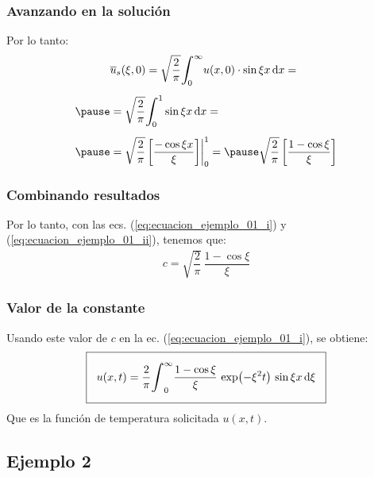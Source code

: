 \documentclass[12pt]{beamer}
\begin{document}
\begin{frame}
\frametitle{Avanzando en la solución}
Por lo tanto:
\pause
\begin{eqnarray}
\begin{aligned}[b]
&{} \overline{u}_{s} (\xi, 0) = \sqrt{\dfrac{2}{\pi}} \scaleint{6ex}_{\bs 0}^{\infty} u(x, 0) \cdot \sin \xi x \dd{x} = \\[0.5em] \pause
&= \sqrt{\dfrac{2}{\pi}} \scaleint{6ex}_{\bs 0}^{1} \sin \xi x \dd{x} = \\[0.5em] \pause
&= \sqrt{\dfrac{2}{\pi}} \, \bigg[ \dfrac{- \cos \xi x}{\xi} \bigg] \bigg|_{0}^{1} = \pause \sqrt{\dfrac{2}{\pi}} \, \bigg[ \dfrac{1 - \cos \xi}{\xi} \bigg]
\end{aligned}
\label{eq:ecuacion_ejemplo_01_ii}
\end{eqnarray}
\end{frame}
\begin{frame}
\frametitle{Combinando resultados}
Por lo tanto, con las ecs. (\ref{eq:ecuacion_ejemplo_01_i}) y (\ref{eq:ecuacion_ejemplo_01_ii}), tenemos que:
\pause
\begin{align*}
c = \sqrt{\dfrac{2}{\pi}} \, \dfrac{1 - \cos \xi}{\xi}
\end{align*}
\end{frame}
\begin{frame}
\frametitle{Valor de la constante}
Usando este valor de $c$ en la ec. (\ref{eq:ecuacion_ejemplo_01_i}), se obtiene:
\pause
\begin{align*}
\setlength{\fboxsep}{3\fboxsep}\boxed{
u(x, t) = \dfrac{2}{\pi} \scaleint{6ex}_{0}^{\infty} \dfrac{1 - \cos \xi}{\xi} \, \exp(- \xi^{2} t) \, \sin \xi x \dd{\xi}}
\end{align*}
Que es la función de temperatura solicitada $u (x, t)$.
\end{frame}

\subsection{Ejemplo 2}
\end{document}

